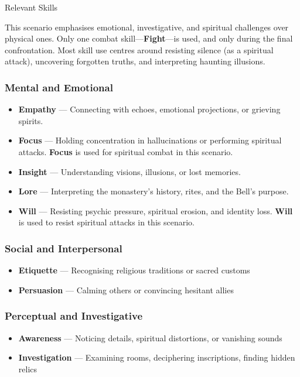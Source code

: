 \begin{CommentBox}{Relevant Skills}\raggedright
    This scenario emphasises emotional, investigative, and spiritual challenges over physical ones. Only one combat skill—\textbf{Fight}—is used, and only during the final confrontation. Most skill use centres around resisting silence (as a spiritual attack), uncovering forgotten truths, and interpreting haunting illusions.
    
    \vspace{0.5\baselineskip}
    
    \subsubsection*{Mental and Emotional}
    \begin{itemize}
        \item \textbf{Empathy} — Connecting with echoes, emotional projections, or grieving spirits.
        \item \textbf{Focus} — Holding concentration in hallucinations or performing spiritual attacks. \textbf{Focus} is used for spiritual combat in this scenario.
        \item \textbf{Insight} — Understanding visions, illusions, or lost memories.
        \item \textbf{Lore} — Interpreting the monastery’s history, rites, and the Bell’s purpose.
        \item \textbf{Will} — Resisting psychic pressure, spiritual erosion, and identity loss. \textbf{Will} is used to resist spiritual attacks in this scenario.
    \end{itemize}
    
    \subsubsection*{Social and Interpersonal}
    \begin{itemize}
        \item \textbf{Etiquette} — Recognising religious traditions or sacred customs
        \item \textbf{Persuasion} — Calming others or convincing hesitant allies
    \end{itemize}
    
    \subsubsection*{Perceptual and Investigative}
    \begin{itemize}\raggedright
        \item \textbf{Awareness} — Noticing details, spiritual distortions, or vanishing sounds
        \item \textbf{Investigation} — Examining rooms, deciphering inscriptions, finding hidden relics
    \end{itemize}
    

\end{CommentBox}
